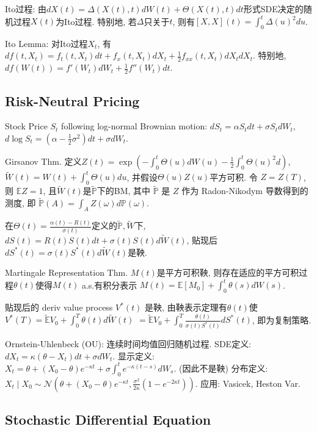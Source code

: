 \documentclass[UTF8]{ctexart}
\begin{document}
Ito过程: 由$dX(t)=\Delta(X(t),t)dW(t)+\Theta(X(t),t)dt$形式SDE决定的随机过程$X(t)$为Ito过程.
特别地, 若$\Delta$只关于$t$, 则有$[X,X](t)=\int_0^t \Delta(u)^2 du$.

Ito Lemma: 对Ito过程$X_t$, 有
$df(t,X_t) = f_t(t,X_t)dt + f_x(t,X_t)dX_t+\frac{1}{2}f_{xx}(t,X_t)dX_tdX_t$.
特别地, $df(W(t)) = f'(W_t)dW_t + \frac{1}{2}f''(W_t)dt$.

\subsection{Risk-Neutral Pricing}

Stock Price $S_t$ following log-normal Brownian motion:
$dS_t = \alpha S_t dt + \sigma S_t dW_t$,
$d \log S_t = (\alpha -\frac{1}{2}\sigma^2)dt+\sigma dW_t$.

Girsanov Thm.
定义$Z(t)=\exp\left(-\int_0^t \Theta(u)dW(u)-\frac12 \int_0^t \Theta(u)^2 d\right)$,
$\widetilde{W}(t)=W(t)+\int_0^t\Theta(u)du$,
并假设$\Theta(u)Z(u)$平方可积.
令 $Z=Z(T)$, 则 $\mathbb{E}Z=1$,
且$\widetilde{W}(t)$是$\widetilde{\mathbb{P}}$下的BM, 其中
$\widetilde{\mathbb{P}}$ 是 $Z$ 作为 Radon-Nikodym 导数得到的测度,
即 $\widetilde{\mathbb{P}}(A)=\int_A Z(\omega)d\mathbb{P}(\omega)$.

在$\Theta(t)=\frac{\alpha(t)-R(t)}{\sigma(t)}$定义的$\widetilde{\mathbb{P}},\widetilde{W}$下,
$dS(t)=R(t)S(t)dt+\sigma(t)S(t)d\widetilde{W}(t)$, 贴现后
$dS^*(t)=\sigma(t) S^*(t) d\widetilde{W}(t)$是鞅.

Martingale Representation Thm.
$M(t)$是平方可积鞅, 则存在适应的平方可积过程$\theta(t)$使得$M(t)$ a.s.有积分表示
$M(t)=\mathbb{E}[M_0]+\int_0^t \theta(s) dW(s)$.

贴现后的 deriv value process $V^*(t)$ 是鞅, 由鞅表示定理有$\theta(t)$使
$V^*(T)=\widetilde{\mathbb{E}}V_0 + \int_0^T \theta(t) d\widetilde{W}(t)$
$=\widetilde{\mathbb{E}}V_0 + \int_0^T \frac{\theta(t)}{\sigma(t)S^*(t)} dS^*(t)$,
即为复制策略.

Ornstein-Uhlenbeck (OU): 连续时间均值回归随机过程.
SDE定义: $dX_t = \kappa (\theta - X_t) dt + \sigma dW_t$.
显示定义: $X_t = \theta + (X_0 - \theta)e^{-\kappa t} + \sigma \int_0^t e^{-\kappa (t-s)} dW_s$. (因此不是鞅)
分布定义: $X_t \mid X_0 \sim \mathcal{N}(\theta + (X_0 - \theta)e^{-\kappa t}, \frac{\sigma^2}{2\kappa}(1-e^{-2\kappa t}))$.
应用: Vasicek, Heston Var.

\subsection{Stochastic Differential Equation}
\end{document}
